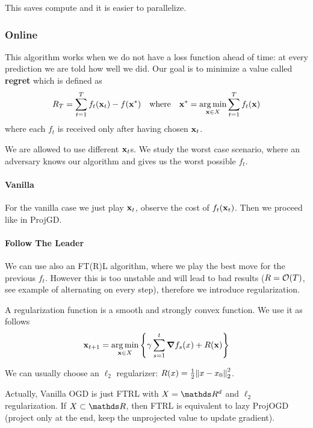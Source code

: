 \documentclass[12pt]{extarticle}
\renewcommand{\vec}[1]{\bvec{#1}}
\numberwithin{equation}{subsection}
\begin{document}
This saves compute and it is easier to parallelize.

\subsubsection{Online}

This algorithm works when we do not have a loss function ahead of time: at every prediction we are
told how well we did. Our goal is to minimize a value called \textbf{regret} which is defined as
\begin{equation}
	R_T = \sum_{t = 1}^{T}  f_t(\vec x_t) - f(\vec x^*) \quad \text{where} \quad
	\vec x^* = \argmin_{\vec x \in X} \sum_{t = 1}^{T} f_t(\vec x)
\end{equation}
where each $f_t$ is received only after having chosen $\vec x_t$.

We are allowed to use different $\vec x_t$s. We study the worst case scenario, where an adversary knows
our algorithm and gives us the worst possible $f_t$.

\paragraph{Vanilla}
For the vanilla case we just play $\vec x_t$, observe the cost of $f_t(\vec x_t)$. Then we proceed
like in ProjGD.


\paragraph{Follow The Leader}
We can use also an FT(R)L algorithm, where we play the best move for the previous $f_t$.
However this is too unstable and will lead to bad results ($R = \mathcal{O}(T)$, see example of alternating
on every step), therefore we introduce regularization.

A regularization function is a smooth and strongly convex function. We use it as follows
\begin{equation}
	\vec x_{t+1} = \argmin_{\vec x \in X} \left\{ \gamma \sum_{s=1}^{t} \grad f_s(x) + R(\vec x) \right\}
\end{equation}

We can usually choose an $\ell_2$ regularizer: $R(x) = \frac{1}{2} \norm{x - x_0}^2_2$.

Actually, Vanilla OGD is just FTRL with $X = \R^d$ and $\ell_2$ regularization.
If $X \subset \R$, then FTRL is equivalent to lazy ProjOGD (project only at the end, keep the
unprojected value to update gradient).
\end{document}
